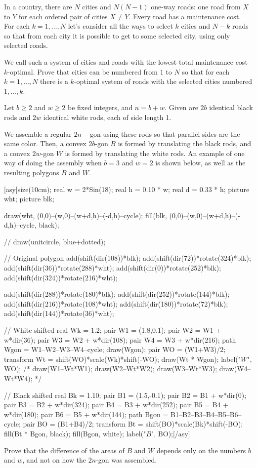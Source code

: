 \documentclass[11pt]{scrartcl}
\begin{document}
\begin{problem}[437956241529021]
	In a country, there are ${}N{}$ cities and $N(N-1)$ one-way roads: one road from $X{}$ to $Y{}$ for each ordered pair of cities $X \neq Y$. Every road has a maintenance cost. For each $k = 1,\ldots, N$ let's consider all the ways to select $k{}$ cities and $N - k{}$ roads so that from each city it is possible to get to some selected city, using only selected roads.

We call such a system of cities and roads with the lowest total maintenance cost $k{}$-optimal. Prove that cities can be numbered from $1{}$ to $N{}$ so that for each $k = 1,\ldots, N$ there is a $k{}$-optimal system of roads with the selected cities numbered $1,\ldots, k$.
\end{problem}
\begin{problem}[2594275832195659804]
Let $b\geq2$ and $w\geq2$ be fixed integers, and $n=b+w$. Given are $2b$ identical black rods and $2w$ identical white rods, each of side length 1.

We assemble a regular $2n-$gon using these rods so that parallel sides are the same color. Then, a convex $2b$-gon $B$ is formed by translating the black rods, and a convex $2w$-gon $W$ is formed by translating the white rods. An example of one way of doing the assembly when $b=3$ and $w=2$ is shown below, as well as the resulting polygons $B$ and $W$.

[asy]size(10cm);
real w = 2*Sin(18);
real h = 0.10 * w;
real d = 0.33 * h;
picture wht;
picture blk;

draw(wht, (0,0)--(w,0)--(w+d,h)--(-d,h)--cycle);
fill(blk, (0,0)--(w,0)--(w+d,h)--(-d,h)--cycle, black);

// draw(unitcircle, blue+dotted);

// Original polygon
add(shift(dir(108))*blk);
add(shift(dir(72))*rotate(324)*blk);
add(shift(dir(36))*rotate(288)*wht);
add(shift(dir(0))*rotate(252)*blk);
add(shift(dir(324))*rotate(216)*wht);

add(shift(dir(288))*rotate(180)*blk);
add(shift(dir(252))*rotate(144)*blk);
add(shift(dir(216))*rotate(108)*wht);
add(shift(dir(180))*rotate(72)*blk);
add(shift(dir(144))*rotate(36)*wht);

// White shifted
real Wk = 1.2;
pair W1 = (1.8,0.1);
pair W2 = W1 + w*dir(36);
pair W3 = W2 + w*dir(108);
pair W4 = W3 + w*dir(216);
path Wgon = W1--W2--W3--W4--cycle;
draw(Wgon);
pair WO = (W1+W3)/2;
transform Wt = shift(WO)*scale(Wk)*shift(-WO);
draw(Wt * Wgon);
label("$W$", WO);
/*
draw(W1--Wt*W1);
draw(W2--Wt*W2);
draw(W3--Wt*W3);
draw(W4--Wt*W4);
*/

// Black shifted
real Bk = 1.10;
pair B1 = (1.5,-0.1);
pair B2 = B1 + w*dir(0);
pair B3 = B2 + w*dir(324);
pair B4 = B3 + w*dir(252);
pair B5 = B4 + w*dir(180);
pair B6 = B5 + w*dir(144);
path Bgon = B1--B2--B3--B4--B5--B6--cycle;
pair BO = (B1+B4)/2;
transform Bt = shift(BO)*scale(Bk)*shift(-BO);
fill(Bt * Bgon, black);
fill(Bgon, white);
label("$B$", BO);[/asy]

Prove that the difference of the areas of $B$ and $W$ depends only on the numbers $b$ and $w$, and not on how the $2n$-gon was assembled.
\end{problem}
\end{document}
